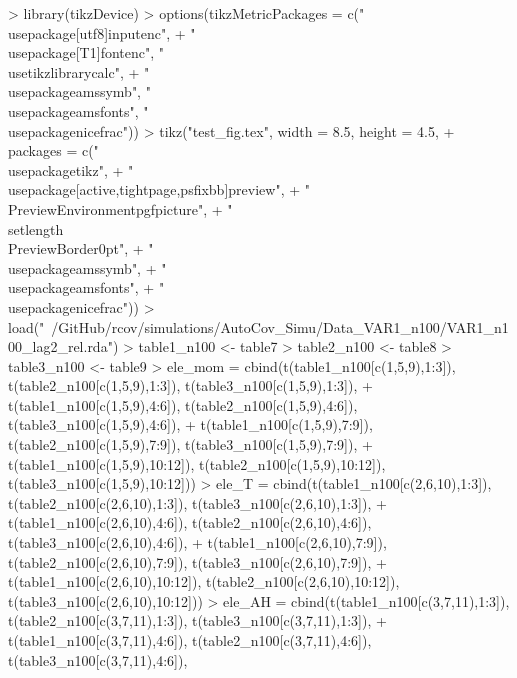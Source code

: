 \documentclass{article}
\begin{document}


\begin{Schunk}
\begin{Sinput}
> library(tikzDevice)
> options(tikzMetricPackages = c("\\usepackage[utf8]{inputenc}",
+     "\\usepackage[T1]{fontenc}", "\\usetikzlibrary{calc}",
+     "\\usepackage{amssymb}", "\\usepackage{amsfonts}", "\\usepackage{nicefrac}"))
> tikz("test_fig.tex", width = 8.5, height = 4.5,
+      packages = c("\\usepackage{tikz}",
+                  "\\usepackage[active,tightpage,psfixbb]{preview}",
+                  "\\PreviewEnvironment{pgfpicture}",
+                  "\\setlength\\PreviewBorder{0pt}",
+                  "\\usepackage{amssymb}",
+                  "\\usepackage{amsfonts}",
+                  "\\usepackage{nicefrac}"))
> load("~/GitHub/rcov/simulations/AutoCov_Simu/Data_VAR1_n100/VAR1_n100_lag2_rel.rda")
> table1_n100 <- table7
> table2_n100 <- table8
> table3_n100 <- table9
> ele_mom = cbind(t(table1_n100[c(1,5,9),1:3]), t(table2_n100[c(1,5,9),1:3]), t(table3_n100[c(1,5,9),1:3]),
+                 t(table1_n100[c(1,5,9),4:6]), t(table2_n100[c(1,5,9),4:6]), t(table3_n100[c(1,5,9),4:6]),
+                 t(table1_n100[c(1,5,9),7:9]), t(table2_n100[c(1,5,9),7:9]), t(table3_n100[c(1,5,9),7:9]),
+                 t(table1_n100[c(1,5,9),10:12]), t(table2_n100[c(1,5,9),10:12]), t(table3_n100[c(1,5,9),10:12]))
> ele_T = cbind(t(table1_n100[c(2,6,10),1:3]), t(table2_n100[c(2,6,10),1:3]), t(table3_n100[c(2,6,10),1:3]),
+               t(table1_n100[c(2,6,10),4:6]), t(table2_n100[c(2,6,10),4:6]), t(table3_n100[c(2,6,10),4:6]),
+               t(table1_n100[c(2,6,10),7:9]), t(table2_n100[c(2,6,10),7:9]), t(table3_n100[c(2,6,10),7:9]),
+               t(table1_n100[c(2,6,10),10:12]), t(table2_n100[c(2,6,10),10:12]), t(table3_n100[c(2,6,10),10:12]))
> ele_AH = cbind(t(table1_n100[c(3,7,11),1:3]), t(table2_n100[c(3,7,11),1:3]), t(table3_n100[c(3,7,11),1:3]),
+                t(table1_n100[c(3,7,11),4:6]), t(table2_n100[c(3,7,11),4:6]), t(table3_n100[c(3,7,11),4:6]),

\end{Sinput}
\end{Schunk}
\end{document}
